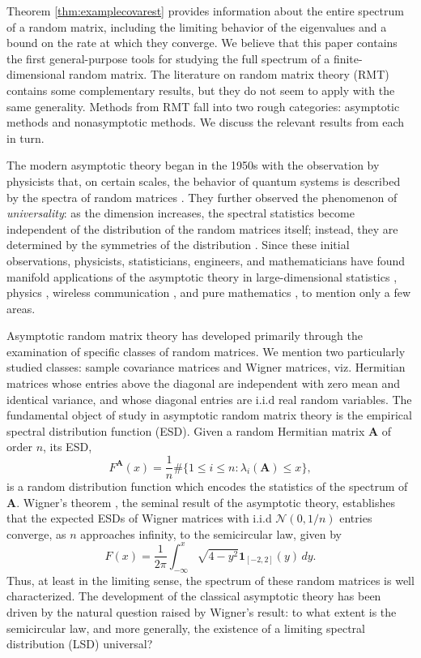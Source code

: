 \documentclass[11pt,letterpaper,twoside,reqno,nosumlimits]{amsart}
\newcommand{\mat}[1]{\ensuremath{\bm{#1}}} %
\theoremstyle{remark}
\numberwithin{equation}{section}
\numberwithin{thm}{section}
\numberwithin{prop}{section}
\numberwithin{defn}{section}
\numberwithin{remark}{section}
\begin{document}
Theorem \ref{thm:examplecovarest} provides information about the entire spectrum of a random matrix, including the limiting behavior of the eigenvalues and a bound on the rate at which they converge. We believe that this paper contains the first general-purpose tools for studying the full spectrum of a finite-dimensional random matrix. The literature on random matrix theory (RMT) contains some complementary results, but they do not seem to apply with the same generality. Methods from RMT fall into two rough categories: asymptotic methods and nonasymptotic methods. We discuss the relevant results from each in turn.

The modern asymptotic theory began in the 1950s with the observation by physicists that, on certain scales, the behavior of quantum systems is described by the spectra of random matrices \cite{Mehta04}. They further observed the phenomenon of \emph{universality}: as the dimension increases, the spectral statistics become independent of the distribution of the random matrices itself; instead, they are determined by the symmetries of the distribution \cite{Deift07}. Since these initial observations, physicists, statisticians, engineers, and mathematicians have found manifold applications of the asymptotic theory in large-dimensional statistics \cite{Johnstone07,BouchaudPotters11}, physics \cite{Forrester10,Mehta04}, wireless communication \cite{TulinoVerdu04,SilversteinTulino06}, and pure mathematics \cite{FirkMiller09}, to mention only a few areas. 

Asymptotic random matrix theory has developed primarily through the examination of specific classes of random matrices. We mention two particularly studied classes: sample covariance matrices and Wigner matrices, viz. Hermitian matrices whose entries above the diagonal are independent with zero mean and identical variance, and whose diagonal entries are i.i.d real random variables. The fundamental object of study in asymptotic random matrix theory is the empirical spectral distribution function (ESD). Given a random Hermitian matrix $\mat{A}$ of order $n$, its ESD,
\[
F^{\mat{A}}(x) = \frac{1}{n} \#\{ 1 \leq i \leq n : \lambda_i(\mat{A}) \leq x \},
\]
is a random distribution function which encodes the statistics of the spectrum of $\mat{A}.$ Wigner's theorem \cite{Wig55}, the seminal result of the asymptotic theory, establishes that the expected ESDs of Wigner matrices with i.i.d $\mathcal{N}(0, 1/n)$ entries converge, as $n$ approaches infinity, to the semicircular law, given by 
\[
F(x) =  \frac{1}{2\pi}\int_{-\infty}^x \sqrt{4-y^2} \mathbf{1}_{[-2,2]}(y)\, dy.
\] 
Thus, at least in the limiting sense, the spectrum of these random matrices is well characterized. The development of the classical asymptotic theory has been driven by the natural question raised by Wigner's result: to what extent is the semicircular law, and more generally, the existence of a limiting spectral distribution (LSD) universal?
\end{document}
